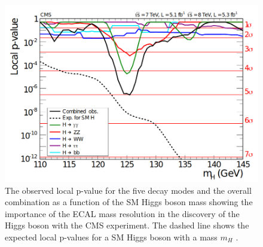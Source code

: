 \begin{figure}[hbtp]
\centering
\includegraphics[scale=0.3]{figures/lhc_and_cms/higgs_observation_cms.png}
\caption{The observed local p-value for the five decay modes and the overall combination as a function of the SM Higgs boson mass showing the importance of the ECAL mass resolution in the discovery of the Higgs boson with the CMS experiment. The dashed line shows the expected local p-values for a SM Higgs boson with a mass $m_{H}$ \cite{cms_higgs}.}
\label{higgs_observation_cms}
\end{figure}